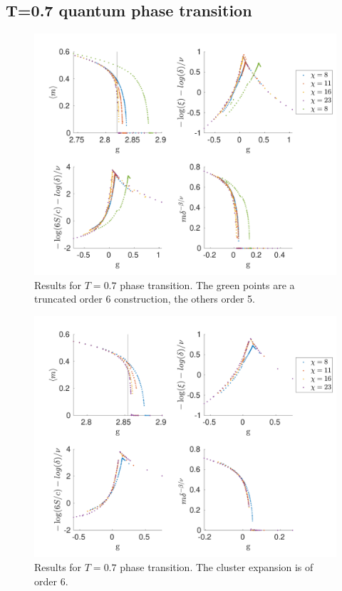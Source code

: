 \subsection{T=0.7 quantum phase transition}\label{tphasetranssubsec}

\begin{figure}[!htbp]
    \center
    \includegraphics[width=\textwidth]{Figuren/phasediag/t07/full.pdf}
    \caption{Results for $T=0.7$ phase transition. The green points are a truncated order 6 construction, the others order 5.  }
    \label{fig:phase:t07:full}
\end{figure}

\begin{figure}[!htbp]
    \center
    \includegraphics[width=\textwidth]{Figuren/phasediag/t07/zoomed2.pdf}
    \caption{Results for $T=0.7$ phase transition. The cluster expansion is of order 6.}
    \label{fig:phase:t07:full2}
\end{figure}

